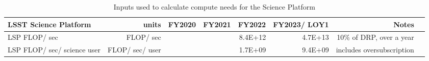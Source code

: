 \tiny \begin{longtable} { |p{}  |r  |r  |r  |r  |r  |r  |r |} 
\caption{Inputs used to calculate compute needs for the Science Platform \label{tab:lspSizing}}\\ 
\hline 
{LSST Science Platform}&{units}&{FY2020}&{FY2021}&{FY2022}&{FY2023/ LOY1}&{Notes} \\ \hline
{LSP FLOP/ sec}&{FLOP/ sec}&{}&{}&{8.4E+12}&{4.7E+13}&{10\% of DRP, over a year} \\ \hline
{LSP FLOP/ sec/ science user}&{FLOP/ sec/ user}&{}&{}&{1.7E+09}&{9.4E+09}&{includes oversubscription} \\ \hline
\end{longtable} \normalsize
